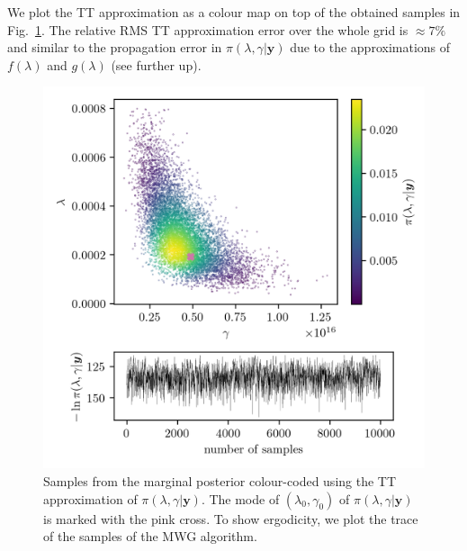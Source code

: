 We plot the TT approximation as a colour map on top of the obtained samples in Fig.~\ref{fig:ScatterPlotTT}.
The relative RMS TT approximation error over the whole grid is $\approx 7\%$ and similar to the propagation error in $\pi(\lambda, \gamma| \bm{y})$ due to the approximations of $f(\lambda)$ and $g(\lambda)$ (see further up).
\begin{figure}[ht!]
	\centering
	\includegraphics{ScatterplusHistoPlusTT.png}
	\caption[Samples from marginal posterior and TT approximation; trace plot of the MWG for $\pi(\lambda, \gamma| \bm{y})$]{Samples from the marginal posterior colour-coded using the TT approximation of $\pi(\lambda , \gamma  | \bm{y})$. The mode of $(\lambda_0 , \gamma_0)$ of $\pi(\lambda , \gamma  | \bm{y})$ is marked with the pink cross. To show ergodicity, we plot the trace of the samples of the MWG algorithm.}
	\label{fig:ScatterPlotTT}
\end{figure}
\clearpage

